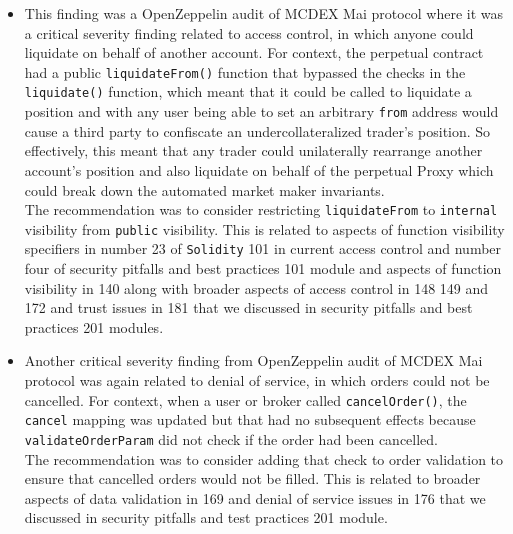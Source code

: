 \begin{itemize}
\item
  This finding was a OpenZeppelin audit of MCDEX Mai protocol where it
  was a critical severity finding related to access control, in which
  anyone could liquidate on behalf of another account. For context, the
  perpetual contract had a public \texttt{liquidateFrom()} function that
  bypassed the checks in the \texttt{liquidate()} function, which meant
  that it could be called to liquidate a position and with any user
  being able to set an arbitrary \texttt{from} address would cause a
  third party to confiscate an undercollateralized trader's position. So
  effectively, this meant that any trader could unilaterally rearrange
  another account's position and also liquidate on behalf of the
  perpetual Proxy which could break down the automated market maker
  invariants.\\

  The recommendation was to consider restricting \texttt{liquidateFrom}
  to \texttt{internal} visibility from \texttt{public} visibility. This
  is related to aspects of function visibility specifiers in number 23
  of \texttt{Solidity} 101 in current access control and number four of
  security pitfalls and best practices 101 module and aspects of
  function visibility in 140 along with broader aspects of access
  control in 148 149 and 172 and trust issues in 181 that we discussed
  in security pitfalls and best practices 201 modules.
\item
  Another critical severity finding from OpenZeppelin audit of MCDEX Mai
  protocol was again related to denial of service, in which orders could
  not be cancelled. For context, when a user or broker called
  \texttt{cancelOrder()}, the \texttt{cancel} mapping was updated but
  that had no subsequent effects because \texttt{validateOrderParam} did
  not check if the order had been cancelled.\\

  The recommendation was to consider adding that check to order
  validation to ensure that cancelled orders would not be filled. This
  is related to broader aspects of data validation in 169 and denial of
  service issues in 176 that we discussed in security pitfalls and test
  practices 201 module.
\end{itemize}
